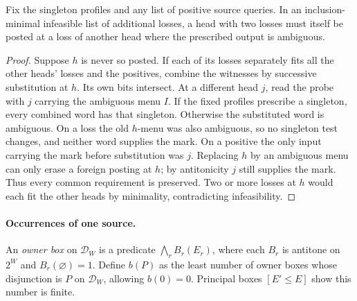 \begin{corollary}
\label{core:cor:unposted-head-omissions}
Fix the singleton profiles and any list of positive source queries.
In an inclusion-minimal infeasible list of additional losses, a head
with two losses must itself be posted at a loss of another head where
the prescribed output is ambiguous.
\end{corollary}
\begin{proof}
Suppose $h$ is never so posted. If each of its losses separately fits
all the other heads' losses and the positives, combine the witnesses
by successive substitution at $h$. Its own bits intersect. At a
different head $j$, read the probe with $j$ carrying the ambiguous
menu $I$. If the fixed profiles prescribe a singleton, every combined
word has that singleton. Otherwise the substituted word is ambiguous.
On a loss the old $h$-menu was also ambiguous, so no singleton test
changes, and neither word supplies the mark. On a positive the only
input carrying the mark before substitution was $j$. Replacing $h$
by an ambiguous menu can only erase a foreign posting at $h$; by
antitonicity $j$ still supplies the mark. Thus every common requirement
is preserved. Two or more losses at $h$ would each fit the other heads
by minimality, contradicting infeasibility.
\end{proof}

\paragraph{Occurrences of one source.}
An \emph{owner box} on $\mathcal D_W$ is a predicate
$\bigwedge_r B_r(E_r)$, where each $B_r$ is antitone on $2^W$ and
$B_r(\varnothing)=1$. Define $b(P)$ as the least number of owner boxes
whose disjunction is $P$ on $\mathcal D_W$, allowing $b(0)=0$.
Principal boxes $[E'\leq E]$ show this number is finite.

